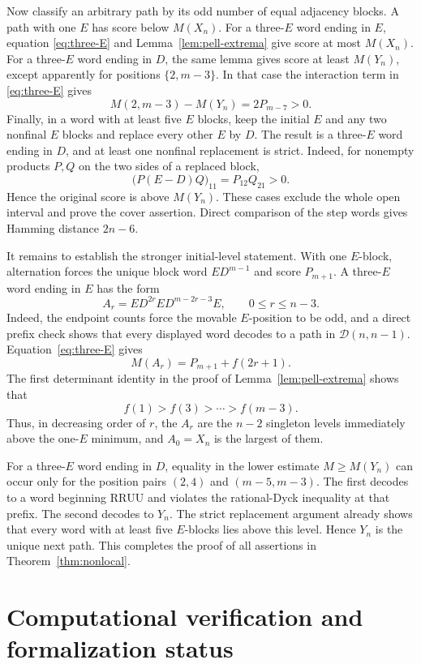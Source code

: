 \documentclass[11pt]{amsart}
\theoremstyle{definition}
\newcommand{\RR}{\mathrm{R}}
\newcommand{\UU}{\mathrm{U}}
\newcommand{\cD}{\mathcal D}
\begin{document}
Now classify an arbitrary path by its odd number of equal adjacency blocks.
A path with one $E$ has score below
$M(X_n)$.  For a three-$E$ word ending in $E$, equation
\eqref{eq:three-E} and Lemma~\ref{lem:pell-extrema} give score at most
$M(X_n)$.  For a three-$E$ word ending in $D$, the same lemma gives score at
least $M(Y_n)$, except apparently for positions $\{2,m-3\}$.  In that case the
interaction term in \eqref{eq:three-E} gives
\[
 M(2,m-3)-M(Y_n)=2P_{m-7}>0.
\]
Finally, in a word with at least five $E$ blocks, keep the initial $E$ and any
two nonfinal $E$ blocks and replace every other $E$ by $D$.  The result is a
three-$E$ word ending in $D$, and at least one nonfinal replacement is strict.
Indeed, for nonempty products $P,Q$ on the two sides of a replaced block,
\[
 \bigl(P(E-D)Q\bigr)_{11}=P_{12}Q_{21}>0.
\]
Hence the original score is above $M(Y_n)$.  These cases
exclude the whole open interval and prove the cover assertion.  Direct
comparison of the step words gives Hamming distance $2n-6$.

It remains to establish the stronger initial-level statement.  With one
$E$-block, alternation forces the unique block word $ED^{m-1}$ and score
$P_{m+1}$.  A three-$E$ word ending in $E$ has the form
\[
 A_r=ED^{2r}ED^{m-2r-3}E,
 \qquad 0\leq r\leq n-3.
\]
Indeed, the endpoint counts force the movable $E$-position to be odd, and a
direct prefix check shows that every displayed word decodes to a path in
$\cD(n,n-1)$.  Equation~\eqref{eq:three-E} gives
\[
 M(A_r)=P_{m+1}+f(2r+1).
\]
The first determinant identity in the proof of
Lemma~\ref{lem:pell-extrema} shows that
\[
 f(1)>f(3)>\cdots>f(m-3).
\]
Thus, in decreasing order of $r$, the $A_r$ are the $n-2$ singleton levels
immediately above the one-$E$ minimum, and $A_0=X_n$ is the largest of them.

For a three-$E$ word ending in $D$, equality in the lower estimate
$M\geq M(Y_n)$ can occur only for the position pairs
$(2,4)$ and $(m-5,m-3)$.  The first decodes to a word beginning
$\RR\RR\UU\UU$ and violates the rational-Dyck inequality at that prefix.
The second decodes to $Y_n$.  The strict replacement argument already shows
that every word with at least five $E$-blocks lies above this level.  Hence
$Y_n$ is the unique next path.  This completes the proof of all assertions in
Theorem~\ref{thm:nonlocal}.

\section{Computational verification and formalization status}
\label{sec:formal}
\end{document}
